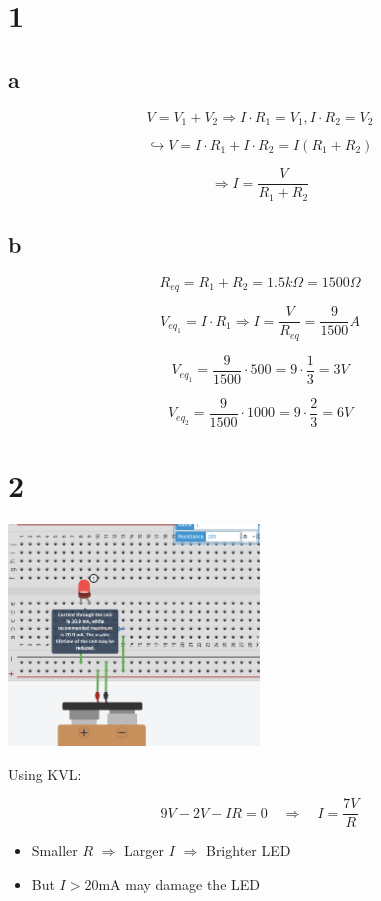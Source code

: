 \documentclass[10pt]{article}
\begin{document}
\section*{1}

\subsection*{a}

$$V = V_1 + V_2 \Rightarrow I \cdot R_1 = V_1, I \cdot R_2 = V_2$$

$$\hookrightarrow V = I \cdot R_1 + I \cdot R_2 = I(R_1 + R_2)$$

$$\Rightarrow I = \frac{V}{R_1 + R_2}$$


\subsection*{b}

$$R_{eq} = R_1 + R_2 = 1.5 k\Omega = 1500 \Omega$$

$$V_{eq_1} = I \cdot R_1 \Rightarrow I = \frac{V}{R_{eq}} = \frac{9}{1500} A$$

$$V_{eq_1} = \frac{9}{1500} \cdot 500 = 9 \cdot \frac{1}{3} = 3V$$

$$V_{eq_2} = \frac{9}{1500} \cdot 1000 = 9 \cdot \frac{2}{3} = 6V$$

\section*{2}


\begin{center}
	\includegraphics[width=0.5\textwidth]{ledbad.png}
\end{center}

Using KVL:

\[
	9V - 2V - IR = 0 \quad \Rightarrow \quad I = \frac{7V}{R}
\]

\begin{itemize}
	\item Smaller $R$ $\Rightarrow$ Larger $I$ $\Rightarrow$ Brighter LED
	\item But $I > 20$mA may damage the LED
\end{itemize}
\end{document}
